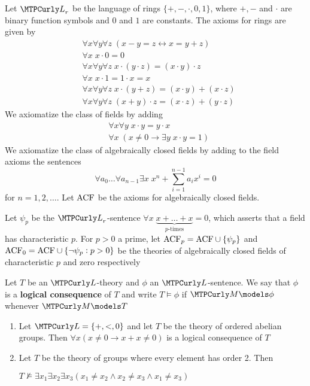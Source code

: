 \documentclass[11pt]{article}
\begin{document}
\begin{examplle}
Let \(\call_r\) be the language of rings \(\{+,-,\cdot,0,1\}\), where \(+,-\) and \(\cdot\)
are binary function symbols and \(0\) and \(1\) are constants. The axioms for rings are given 
by
\begin{align*}
&\forall x\forall y\forall z\;(x-y=z\leftrightarrow x=y+z)\\
&\forall x\;x\cdot 0=0\\
&\forall x\forall y\forall z\;x\cdot(y\cdot z)=(x\cdot y)\cdot z\\
&\forall x\;x\cdot 1=1\cdot x=x\\
&\forall x\forall y\forall z\;x\cdot(y+z)=(x\cdot y)+(x\cdot z)\\
&\forall x\forall y\forall z\;(x+y)\cdot z=(x\cdot z)+(y\cdot z)
\end{align*}
We axiomatize the class of fields by adding
\begin{align*}
&\forall x\forall y\;x\cdot y=y\cdot x\\
&\forall x\;(x\neq 0\to\exists y\;x\cdot y=1)
\end{align*}
We axiomatize the class of algebraically closed fields by adding to the field axioms the sentences
\begin{equation*}
\forall a_0\dots\forall a_{n-1}\exists x\;x^n+\displaystyle\sum_{i=1}^{n-1}
a_ix^i=0
\end{equation*}
for \(n=1,2,\dots\). Let \(\text{ACF}\) be the axioms for algebraically closed fields.

Let \(\psi_p\) be the \(\call_r\)-sentence \(\forall x\;
   \underbrace{x+\dots+x}_{p\text{-times}}=0\), which asserts that a field has characteristic
\(p\). For \(p>0\) a prime, let \(\text{ACF}_p=\text{ACF}\cup\{\psi_p\}\) and
\(\text{ACF}_0=\text{ACF}\cup\{\neg\psi_p:p>0\}\) be the theories of algebraically
closed fields of characteristic \(p\) and zero respectively
\end{examplle}

\begin{definition}[]
Let \(T\) be an \(\call\)-theory and \(\phi\) an \(\call\)-sentence. We say that
\(\phi\) is a \textbf{logical consequence} of \(T\) and write \(T\models\phi\) if
\(\calm\models\phi\) whenever \(\calm\models T\)
\end{definition}

\begin{proposition}[]
\begin{enumerate}
\item Let \(\call=\{+,<,0\}\) and let \(T\) be the theory of ordered abelian groups.
Then \(\forall x(x\neq 0\to x+x\neq 0)\) is a logical consequence of \(T\)
\item Let \(T\) be the theory of groups where every element has order 2. Then\par
\(T\not\models\exists x_1\exists x_2\exists x_3(x_1\neq x_2\wedge
      x_2\neq x_3\wedge x_1\neq x_3)\)
\end{enumerate}
\end{proposition}
\end{document}
